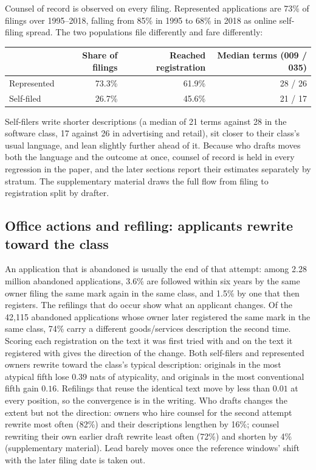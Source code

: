 Counsel of record is observed on every filing. Represented applications
are 73\% of filings over 1995--2018, falling from 85\% in 1995 to 68\% in
2018 as online self-filing spread. The two populations file differently
and fare differently:

\begin{center}\small
\begin{tabular}{lrrr}
\toprule
 & Share of filings & Reached registration & Median terms (009 / 035) \\
\midrule
Represented & 73.3\% & 61.9\% & 28 / 26 \\
Self-filed  & 26.7\% & 45.6\% & 21 / 17 \\
\bottomrule
\end{tabular}
\end{center}

\noindent Self-filers write shorter descriptions (a median of 21 terms
against 28 in the software class, 17 against 26 in advertising and
retail), sit closer to their class's usual language, and lean slightly
further ahead of it. Because who drafts moves both the language and the
outcome at once, counsel of record is held in every regression in the
paper, and the later sections report their estimates separately by
stratum. The supplementary material draws the full flow from filing to
registration split by drafter.

\subsection{Office actions and refiling: applicants rewrite toward the class}\label{sec:amend}

An application that is abandoned is usually the end of that attempt: among
2.28 million abandoned applications, 3.6\% are followed within six years
by the same owner filing the same mark again in the same class, and 1.5\%
by one that then registers. The refilings that do occur show what an
applicant changes. Of the 42{,}115 abandoned applications whose owner
later registered the same mark in the same class, 74\% carry a different
goods/services description the second time. Scoring each registration on
the text it was first tried with and on the text it registered with gives
the direction of the change. Both self-filers and represented owners
rewrite toward the class's typical description: originals in the most
atypical fifth lose $0.39$ nats of atypicality, and originals in the most
conventional fifth gain $0.16$. Refilings that reuse the identical text
move by less than $0.01$ at every position, so the convergence is in the
writing. Who drafts changes the extent but not the direction: owners who
hire counsel for the second attempt rewrite most often (82\%) and their
descriptions lengthen by 16\%; counsel rewriting their own earlier draft
rewrite least often (72\%) and shorten by 4\% (supplementary material).
Lead barely moves once the reference windows' shift with the later filing
date is taken out.

